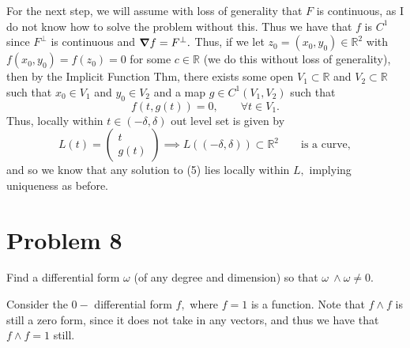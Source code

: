 \documentclass[11pt]{article}
\newcommand{\bbR}{\mathbb{R}}
\begin{document}
\begin{solution}
    For the next step, we will assume with loss of generality that $F$ is continuous, as I do not know how to solve the problem without this. Thus we have that $f$ is $C^1$ since $F^\perp$ is continuous and $\grad f = F^\perp.$ 
    Thus, if we let $z_0 = (x_0, y_0)\in \bbR^2$ with $f(x_0, y_0) = f(z_0) = 0$ for some $c\in \bbR$ (we do this without loss of generality), then by the Implicit Function Thm, there exists some open $V_1 \subset \bbR$  and $V_2 \subset \bbR$ such that $x_0 \in V_1$ and $y_0 \in V_2$ and a map $g \in C^1(V_1, V_2)$ such that 
    \[f(t, g(t)) =0, \qquad \forall t\in V_1.\] Thus, locally within $t\in (-\delta, \delta)$ out level set is given by \[L(t) = \begin{pmatrix}
        t \\ g(t)
    \end{pmatrix} \implies L((-\delta, \delta))\subset \bbR^2 \qquad \text{is a curve},\] and so we know that any solution to (5) lies locally within $L,$ implying uniqueness as before.
\end{solution}

   \newpage
   \section*{Problem 8}
   \begin{problem}
       Find a differential form $\omega$ (of any degree and dimension) so that $\omega \
\wedge \omega \neq 0$.
   \end{problem}
   \begin{solution}
   Consider the $0-$ differential form $f,$ where $f=1$ is a function. Note that $f \wedge f$ is still a zero form, since it does not take in any vectors, and thus we have that $f \wedge f = 1$ still.
   \end{solution}

\newpage
\end{document}

